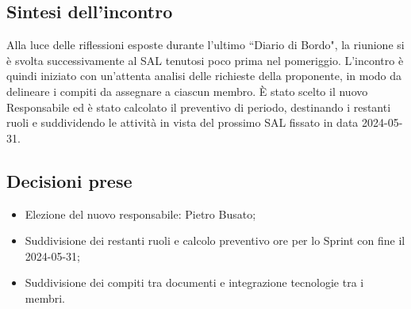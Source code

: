 \documentclass[8pt]{article}
\begin{document}
\subsection{Sintesi dell'incontro}
Alla luce delle riflessioni esposte durante l'ultimo ``Diario di Bordo", la riunione si è svolta
successivamente al SAL tenutosi poco prima nel pomeriggio. L'incontro è quindi iniziato con
un'attenta analisi delle richieste della proponente, in modo da delineare i compiti da assegnare a
ciascun membro. È stato scelto il nuovo Responsabile ed è stato calcolato il preventivo di periodo,
destinando i restanti ruoli e suddividendo le attività in vista del prossimo SAL fissato in data
2024-05-31.

\subsection{Decisioni prese}
\begin{itemize}
	\setlength\itemsep{0em}
\item Elezione del nuovo responsabile: Pietro Busato;
	\item Suddivisione dei restanti ruoli e calcolo preventivo ore per lo Sprint con fine il
      2024-05-31;
	\item Suddivisione dei compiti tra documenti e integrazione tecnologie tra i membri.
\end{itemize}
\newpage
\end{document}

